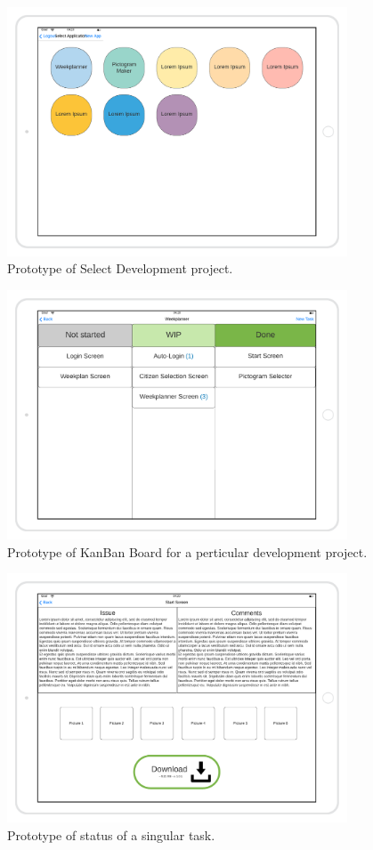 \begin{figure}[H]
    \centering
        \includegraphics[width=0.9\textwidth]{images/Select-App-Mockup.png}
        \caption{Prototype of Select Development project.}
\end{figure}
\begin{figure}[H]
    \centering
    \includegraphics[width=0.9\textwidth]{images/KanBan-mockup.png}
    \caption{Prototype of KanBan Board for a perticular development project.}
\end{figure}
\begin{figure}[H]
    \centering
    \includegraphics[width=0.9\textwidth]{images/view-a-task-mockup.png}
    \caption{Prototype of status of a singular task.}
\end{figure}